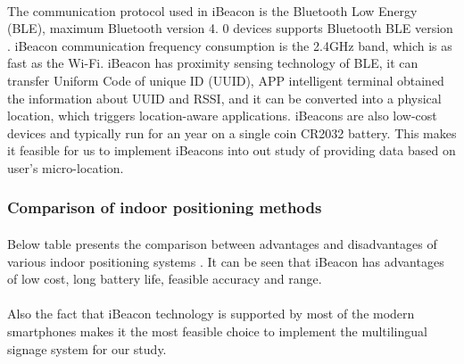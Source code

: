 \documentclass[12pt]{article}
\begin{document}
\paragraph{}The communication protocol used in iBeacon is the Bluetooth Low Energy (BLE), maximum Bluetooth version 4. 0 devices supports Bluetooth BLE version \cite{indoor}. iBeacon communication frequency consumption is the 2.4GHz band, which is as fast as the Wi-Fi. iBeacon has proximity sensing technology of BLE, it can transfer Uniform Code of unique ID (UUID), APP intelligent terminal obtained the information about UUID and RSSI, and it can be converted into a physical location, which triggers location-aware applications. iBeacons are also low-cost devices and typically run for an year on a single coin CR2032 battery. \cite{audioBeacon} This makes it feasible for us to implement iBeacons into out study of providing data based on user's micro-location.

\subsubsection{Comparison of indoor positioning methods}
\paragraph{} Below table presents the comparison between advantages and disadvantages of various indoor positioning systems \cite{sensing}. It can be seen that iBeacon has advantages of low cost, long battery life, feasible accuracy and range. %

\paragraph{} Also the fact that iBeacon technology is supported by most of the modern smartphones \cite{indoor} makes it the most feasible choice to implement the multilingual signage system for our study.
 
\end{document}
